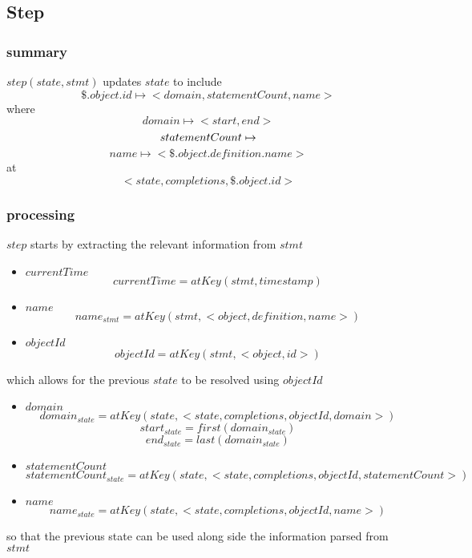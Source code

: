 \documentclass[../main.tex]{subfiles}
\begin{document}
\subsection{Step}
\subsubsection{summary}
$step(state, stmt)$ updates $state$ to include
$$\$.object.id \mapsto <domain, statementCount, name>$$
where
$$domain \mapsto <start, end> $$
$$statementCount \mapsto \real$$
$$name \mapsto <\$.object.definition.name>$$
at
$$<state, completions, \$.object.id>$$

\subsubsection{processing}
$step$ starts by extracting the relevant information from $stmt$
\begin{itemize}
\item $currentTime$
  $$currentTime = atKey(stmt, timestamp)$$
\item $name$
  $$name_{stmt} = atKey(stmt, <object, definition, name>)$$
\item $objectId$
  $$objectId = atKey(stmt, <object, id>)$$
\end{itemize}
which allows for the previous $state$ to be resolved using $objectId$
\begin{itemize}
\item $domain$
  $$domain_{state} = atKey(state, <state, completions, objectId, domain>)$$
  $$start_{state} = first(domain_{state})$$
  $$end_{state} = last(domain_{state})$$
\item $statementCount$
  $$statementCount_{state} = atKey(state, <state, completions, objectId, statementCount>)$$
\item $name$
  $$name_{state} = atKey(state, <state, completions, objectId, name>)$$
\end{itemize}
so that the previous state can be used along side the information parsed from $stmt$
\end{document}
